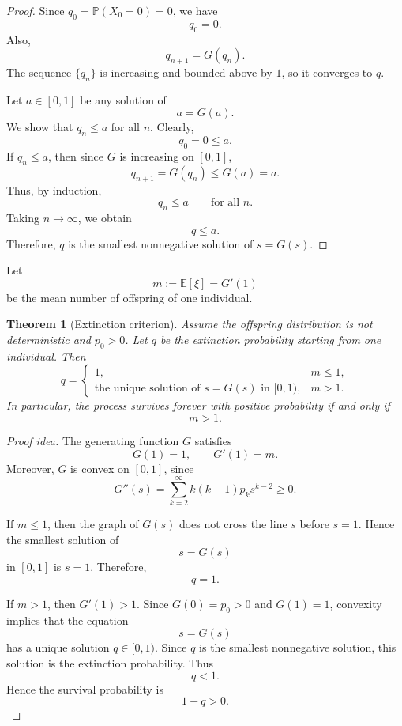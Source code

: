 \documentclass[11pt]{article}
\theoremstyle{plain}
\newtheorem{theorem}{Theorem}[section]
\theoremstyle{definition}
\theoremstyle{remark}
\begin{document}
	\begin{proof}
		Since \(q_0=\mathbb{P}(X_0=0)=0\), we have
		\[
		q_0=0.
		\]
		Also,
		\[
		q_{n+1}=G(q_n).
		\]
		The sequence \(\{q_n\}\) is increasing and bounded above by \(1\), so it converges to \(q\).
		
		Let \(a\in[0,1]\) be any solution of
		\[
		a=G(a).
		\]
		We show that \(q_n\le a\) for all \(n\). Clearly,
		\[
		q_0=0\le a.
		\]
		If \(q_n\le a\), then since \(G\) is increasing on \([0,1]\),
		\[
		q_{n+1}
		=
		G(q_n)
		\le
		G(a)
		=
		a.
		\]
		Thus, by induction,
		\[
		q_n\le a
		\qquad
		\text{for all }n.
		\]
		Taking \(n\to\infty\), we obtain
		\[
		q\le a.
		\]
		Therefore, \(q\) is the smallest nonnegative solution of \(s=G(s)\).
	\end{proof}
	
	
	Let
	\[
	m:=\mathbb{E}[\xi]=G'(1)
	\]
	be the mean number of offspring of one individual.
	
	\begin{theorem}[Extinction criterion]
		Assume the offspring distribution is not deterministic and \(p_0>0\). Let \(q\) be the extinction probability starting from one individual. Then
		\[
		q=
		\begin{cases}
			1, & m\le 1,\\[6pt]
			\text{the unique solution of }s=G(s)\text{ in }[0,1), & m>1.
		\end{cases}
		\]
		In particular, the process survives forever with positive probability if and only if
		\[
		m>1.
		\]
	\end{theorem}
	
	\begin{proof}[Proof idea]
		The generating function \(G\) satisfies
		\[
		G(1)=1,
		\qquad
		G'(1)=m.
		\]
		Moreover, \(G\) is convex on \([0,1]\), since
		\[
		G''(s)
		=
		\sum_{k=2}^{\infty}k(k-1)p_ks^{k-2}
		\ge 0.
		\]
		
		If \(m\le 1\), then the graph of \(G(s)\) does not cross the line \(s\) before \(s=1\). Hence the smallest solution of
		\[
		s=G(s)
		\]
		in \([0,1]\) is \(s=1\). Therefore,
		\[
		q=1.
		\]
		
		If \(m>1\), then \(G'(1)>1\). Since \(G(0)=p_0>0\) and \(G(1)=1\), convexity implies that the equation
		\[
		s=G(s)
		\]
		has a unique solution \(q\in[0,1)\). Since \(q\) is the smallest nonnegative solution, this solution is the extinction probability. Thus
		\[
		q<1.
		\]
		Hence the survival probability is
		\[
		1-q>0.
		\]
	\end{proof}
	
\end{document}
